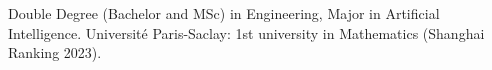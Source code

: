 \documentclass[9pt,a4paper,ragged2e]{altacv}
\begin{document}
Double Degree (Bachelor and MSc) in Engineering, Major in Artificial Intelligence. Université Paris-Saclay: 1st university in Mathematics (Shanghai Ranking
2023).




















%


\end{document}
